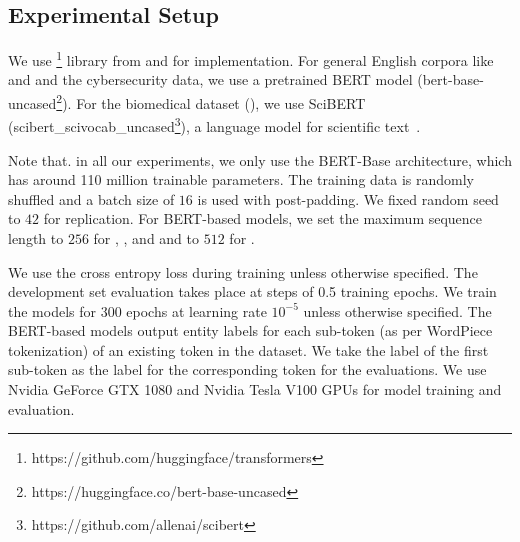

\subsection{Experimental Setup}
We use \footnote{https://github.com/huggingface/transformers} library from  and  for implementation. 
For general English corpora like  and 
and the cybersecurity data, we use a pretrained BERT model (bert-base-uncased\footnote{https://huggingface.co/bert-base-uncased}). 
For the biomedical dataset (), we use SciBERT
(scibert\_scivocab\_uncased\footnote{https://github.com/allenai/scibert}), a language model for scientific text~\cite{beltagy-etal-2019-scibert}. 

Note that. in all our experiments, we only use the BERT-Base architecture, which has around 110 million trainable parameters. 
The training data is randomly shuffled and a batch size of $16$ is used with post-padding. We fixed random seed to $42$ for replication.
For BERT-based models, we set the maximum sequence length to $256$ for ,  , and  and to $512$ for . 


We use the cross entropy loss during training unless otherwise specified. 
The development set evaluation takes place at steps of 0.5 training epochs. We train the models for $300$ epochs at learning rate $10^{-5}$ unless otherwise specified.
The BERT-based models output entity labels for each sub-token (as per WordPiece tokenization) of an existing token in the dataset. 
We take the label of the first sub-token as the label for the corresponding token for the evaluations.
We use Nvidia GeForce GTX 1080 and Nvidia Tesla V100 GPUs for model training and evaluation.

